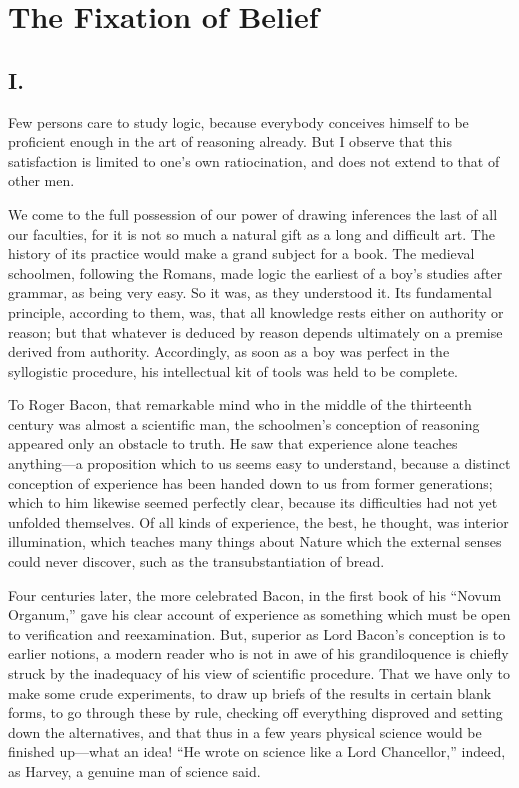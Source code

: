 
\author{Charles Sanders Peirce}
\chapter{The Fixation of Belief}


\section*{I.}

Few persons care to study logic, because everybody conceives himself
to be proficient enough in the art of reasoning already. But I observe
that this satisfaction is limited to one's own ratiocination, and does
not extend to that of other men.

We come to the full possession of our power of drawing inferences the
last of all our faculties, for it is not so much a natural gift as a
long and difficult art. The history of its practice would make a grand
subject for a book. The medieval schoolmen, following the Romans, made
logic the earliest of a boy's studies after grammar, as being very
easy. So it was, as they understood it. Its fundamental principle,
according to them, was, that all knowledge rests either on authority
or reason; but that whatever is deduced by reason depends ultimately
on a premise derived from authority. Accordingly, as soon as a boy
was perfect in the syllogistic procedure, his intellectual kit of
tools was held to be complete.

To Roger Bacon, that remarkable mind who in the middle of the
thirteenth century was almost a scientific man, the schoolmen's
conception of reasoning appeared only an obstacle to truth. He saw
that experience alone teaches anything---a proposition which to us
seems easy to understand, because a distinct conception of experience
has been handed down to us from former generations; which to him
likewise seemed perfectly clear, because its difficulties had not yet
unfolded themselves. Of all kinds of experience, the best, he thought,
was interior illumination, which teaches many things about Nature
 which the external senses could never discover, such as the
transubstantiation of bread.

Four centuries later, the more celebrated Bacon, in the first book of
his ``Novum Organum,'' gave his clear account of experience as
something which must be open to verification and reexamination. But,
superior as Lord Bacon's conception is to earlier notions, a modern
reader who is not in awe of his grandiloquence is chiefly struck by
the inadequacy of his view of scientific procedure. That we have only
to make some crude experiments, to draw up briefs of the results in
certain blank forms, to go through these by rule, checking off
everything disproved and setting down the alternatives, and that thus
in a few years physical science would be finished up---what an idea!
``He wrote on science like a Lord Chancellor,'' indeed, as Harvey, a
genuine man of science said.

